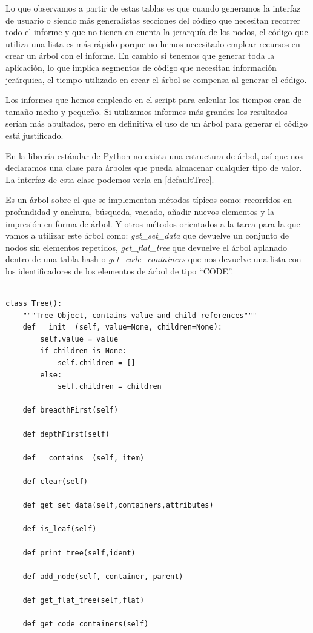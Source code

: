 Lo que observamos a partir de estas tablas es que cuando generamos la interfaz de usuario o siendo más generalistas secciones del código que necesitan recorrer todo el informe y que no tienen en cuenta la jerarquía de los nodos, el código que utiliza una lista es más rápido porque no hemos necesitado emplear recursos en crear un árbol con el informe. En cambio si tenemos que generar toda la aplicación, lo que implica segmentos de código que necesitan información jerárquica, el tiempo utilizado en crear el árbol se compensa al generar el código.\par

Los informes que hemos empleado en el script para calcular los tiempos eran de tamaño medio y pequeño. Si utilizamos informes más grandes los resultados serían más abultados, pero en definitiva el uso de un árbol para generar el código está justificado.\medskip\par

En la librería estándar de Python no exista una estructura de árbol, así que nos declaramos una clase para árboles que pueda almacenar cualquier tipo de valor. La interfaz de esta clase podemos verla en \ref{defaultTree}.\par
Es un árbol sobre el que se implementan métodos típicos como: recorridos en profundidad y anchura, búsqueda, vaciado, añadir nuevos elementos y la impresión en forma de árbol. Y otros métodos orientados a la tarea para la que vamos a utilizar este árbol como: \emph{get\_set\_data} que devuelve un conjunto de nodos sin elementos repetidos, \emph{get\_flat\_tree} que devuelve el árbol aplanado dentro de una tabla hash o \emph{get\_code\_containers} que nos devuelve una lista con los identificadores de los elementos de árbol de tipo ``CODE''.\par 

\begin{lstlisting}[label=defaultTree,caption=Clase para árboles genéricos]

class Tree():
    """Tree Object, contains value and child references"""
    def __init__(self, value=None, children=None):
        self.value = value
        if children is None:
            self.children = []
        else:
            self.children = children

    def breadthFirst(self)

    def depthFirst(self)

    def __contains__(self, item)

    def clear(self)
    
    def get_set_data(self,containers,attributes)

    def is_leaf(self)

    def print_tree(self,ident)

    def add_node(self, container, parent)

    def get_flat_tree(self,flat)

    def get_code_containers(self)

\end{lstlisting}

